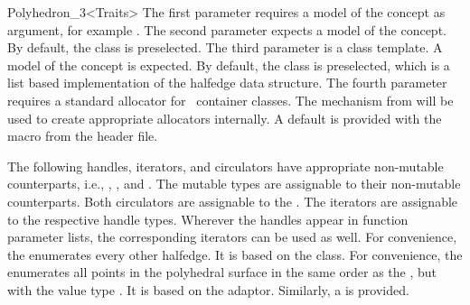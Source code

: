 \begin{ccRefClass}{Polyhedron_3<Traits>}
The first parameter requires a model of the 
concept as argument, for example .  The
second parameter expects a model of the 
concept.  By default, the class  is
preselected. The third parameter is a class template. A model of the
 concept is expected. By default, the class
 is preselected, which is a list based
implementation of the halfedge data structure.
The fourth parameter  requires a standard allocator for
\stl\ container classes. The   mechanism from 
will be used to create appropriate allocators internally. A default is
provided with the macro  from the
 header file.

\ccTypes


\ccGlue
{}
\ccGlue
{}

\ccGlue
{}
\ccGlue
{}
\ccGlue
{}
\ccGlue
{}

\ccGlue
{}
\ccGlue
{}

\ccGlue
{}


The following handles, iterators, and circulators have appropriate
non-mutable counterparts, i.e., ,
, and . The mutable types are
assignable to their non-mutable counterparts.  Both circulators are
assignable to the . The iterators are
assignable to the respective handle types. Wherever the handles appear
in function parameter lists, the corresponding iterators can be used as
well. For convenience, the  enumerates every other
halfedge. It is based on the  class. For
convenience, the  enumerates all points in the polyhedral
surface in the same order as the , but with the
value type . It is based on the 
adaptor. Similarly, a  is provided.


\end{ccRefClass}
